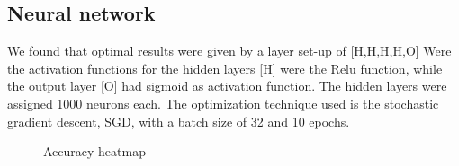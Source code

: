 \subsection{Neural network}
We found that optimal results were given by a layer set-up of [H,H,H,H,O] Were the activation functions for the hidden layers [H] were the Relu function, while the output layer [O] had sigmoid as activation function. The hidden layers were assigned 1000 neurons each. The optimization technique used is the stochastic gradient descent, SGD, with a batch size of 32 and 10 epochs. 
\\
\par 
\begin{figure}[H]
  \centering
  \hfill
  \hfill
  \caption{Accuracy heatmap}
\end{figure}
\newpage
